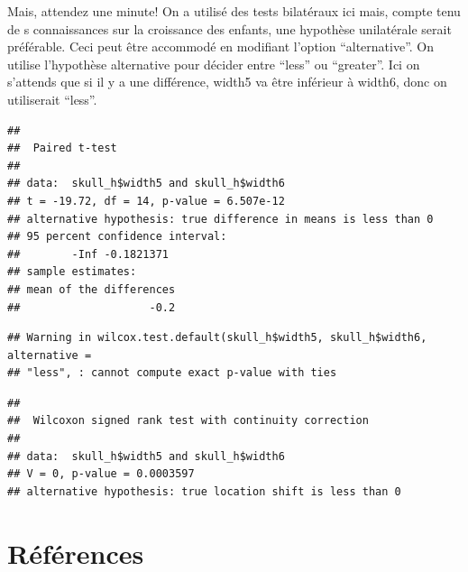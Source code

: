 \documentclass[12pt,]{book}
\newenvironment{Shaded}{\begin{snugshade}}{\end{snugshade}}
\newcommand{\DataTypeTok}[1]{\textcolor[rgb]{0.13,0.29,0.53}{#1}}
\newcommand{\KeywordTok}[1]{\textcolor[rgb]{0.13,0.29,0.53}{\textbf{#1}}}
\newcommand{\NormalTok}[1]{#1}
\newcommand{\OperatorTok}[1]{\textcolor[rgb]{0.81,0.36,0.00}{\textbf{#1}}}
\newcommand{\OtherTok}[1]{\textcolor[rgb]{0.56,0.35,0.01}{#1}}
\newcommand{\StringTok}[1]{\textcolor[rgb]{0.31,0.60,0.02}{#1}}
\begin{document}
Mais, attendez une minute! On a utilisé des tests bilatéraux ici mais, compte tenu de s connaissances sur la croissance des enfants, une hypothèse unilatérale serait préférable. Ceci peut être accommodé en modifiant l'option ``alternative''. On utilise l'hypothèse alternative pour décider entre ``less'' ou ``greater''. Ici on s'attends que si il y a une différence, width5 va être inférieur à width6, donc on utiliserait ``less''.

\begin{Shaded}
\end{Shaded}

\begin{verbatim}
## 
##  Paired t-test
## 
## data:  skull_h$width5 and skull_h$width6
## t = -19.72, df = 14, p-value = 6.507e-12
## alternative hypothesis: true difference in means is less than 0
## 95 percent confidence interval:
##        -Inf -0.1821371
## sample estimates:
## mean of the differences 
##                    -0.2
\end{verbatim}

\begin{Shaded}
\end{Shaded}

\begin{verbatim}
## Warning in wilcox.test.default(skull_h$width5, skull_h$width6, alternative =
## "less", : cannot compute exact p-value with ties
\end{verbatim}

\begin{verbatim}
## 
##  Wilcoxon signed rank test with continuity correction
## 
## data:  skull_h$width5 and skull_h$width6
## V = 0, p-value = 0.0003597
## alternative hypothesis: true location shift is less than 0
\end{verbatim}

\hypertarget{ruxe9fuxe9rences}{%
\section{Références}\label{ruxe9fuxe9rences}}
\end{document}
